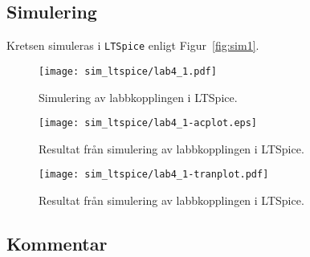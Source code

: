\subsection{Simulering}\label{}
Kretsen simuleras i \texttt{LTSpice} enligt Figur~\ref{fig:sim1}.

\begin{figure}
    \centering
    \texttt{[image: sim\_ltspice/lab4\_1.pdf]}
    \caption[Simulering av labbkopplingen i LTSpice.]
    {Simulering av labbkopplingen i LTSpice.}
    \label{bode-sim}
\end{figure}

\begin{sidewaysfigure}[ht]
    \centering
    \texttt{[image: sim\_ltspice/lab4\_1-acplot.eps]}
    \caption[Kretsens frekvensåtergivning. Resultat från simulering av
    labbkopplingen i LTSpice.]
    {Resultat från simulering av labbkopplingen i LTSpice.}
    \label{bode-sim}
\end{sidewaysfigure}

\begin{sidewaysfigure}[ht]
    \centering
    \texttt{[image: sim\_ltspice/lab4\_1-tranplot.pdf]}
    \caption[Kretsens transientrespons för olika frekvenser hos V1. Resultat
från simulering av labbkopplingen i LTSpice.]
    {Resultat från simulering av labbkopplingen i LTSpice.}
    \label{bode-sim}
\end{sidewaysfigure}



\subsection{Kommentar}\label{}


